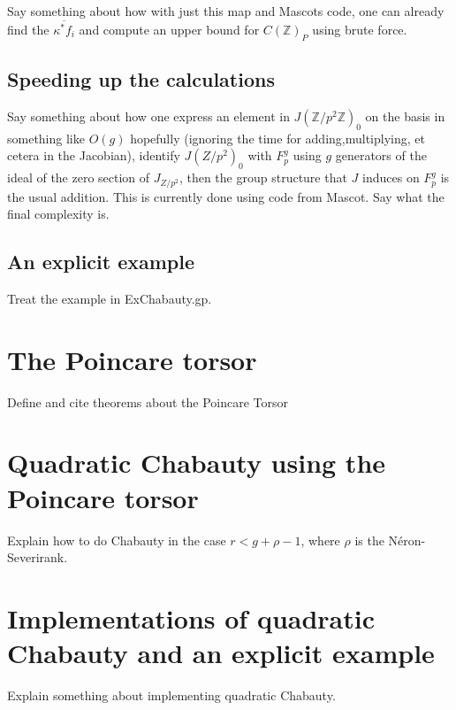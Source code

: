 \documentclass{article}
\newcommand{\Z}{\mathbb{Z}}
\theoremstyle{plain}
\theoremstyle{definition}
\theoremstyle{remark}
\begin{document}
Say something about how with just this map and Mascots code, one can already find the $\overline{\kappa^* f_i} $ and compute an upper bound for $C(\Z)_P$ using brute force.

\subsection{Speeding up the calculations}
Say something about how one express an element in $J(\Z/p^2\Z)_0$ on the basis in something like $O(g)$ hopefully (ignoring the time for adding,multiplying, et cetera in the Jacobian), identify $J(Z/p^2)_0$ with $F_p^g$ using $g$ generators of the ideal of the zero section of $J_{Z/p^2}$, then the group structure that $J$ induces on $F_p^g$ is the usual addition. This is currently done using code from Mascot. Say what the final complexity is.

\subsection{An explicit example}
Treat the example in ExChabauty.gp.

\section{The Poincare torsor}
Define and cite theorems about the Poincare Torsor

\section{Quadratic Chabauty using the Poincare torsor}
Explain how to do Chabauty in the case $r < g + \rho - 1$, where $\rho$ is the N\'eron-Severirank.

\section{Implementations of quadratic Chabauty and an explicit example}
Explain something about implementing quadratic Chabauty.

\newpage


\end{document}
